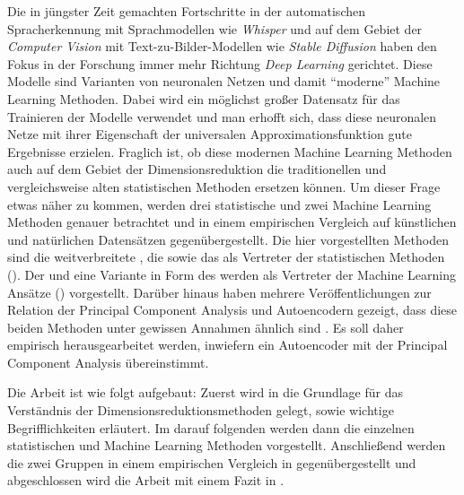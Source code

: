 Die in jüngster Zeit gemachten Fortschritte in der automatischen Spracherkennung mit Sprachmodellen
wie \textit{Whisper} \parencite{Radford.2022} und auf dem Gebiet der \textit{Computer Vision} mit Text-zu-Bilder-Modellen
wie \textit{Stable Diffusion} \parencite{Rombach.2021} haben den Fokus in der Forschung immer mehr Richtung \textit{Deep Learning}
gerichtet. Diese Modelle sind Varianten von neuronalen Netzen und damit \enquote{moderne} Machine
Learning Methoden. Dabei wird ein möglichst großer Datensatz für das Trainieren der Modelle
verwendet und man erhofft sich, dass diese neuronalen Netze mit ihrer Eigenschaft der universalen
Approximationsfunktion \parencites[194 -- 197]{Goodfellow.2016}{Hornik.1989} gute Ergebnisse erzielen. Fraglich ist, ob diese
modernen Machine Learning Methoden auch auf dem Gebiet der Dimensionsreduktion die traditionellen
und vergleichsweise alten statistischen Methoden ersetzen können. Um dieser Frage etwas näher zu
kommen, werden drei statistische und zwei Machine Learning Methoden genauer betrachtet und in einem
empirischen Vergleich auf künstlichen und natürlichen Datensätzen gegenübergestellt. Die hier
vorgestellten Methoden sind die weitverbreitete , die
 sowie das  als
Vertreter der statistischen Methoden (). Der
 und eine Variante in Form des  werden als
Vertreter der Machine Learning Ansätze () vorgestellt. Darüber
hinaus haben mehrere Veröffentlichungen zur Relation der Principal Component Analysis und
Autoencodern gezeigt, dass diese beiden Methoden unter gewissen Annahmen ähnlich sind \parencites{Baldi.1989}{Bourlard.1988}{Plaut.2018}. Es soll daher empirisch herausgearbeitet werden,
inwiefern ein Autoencoder mit der Principal Component Analysis übereinstimmt.

Die Arbeit ist wie folgt aufgebaut: Zuerst wird in  die Grundlage
für das Verständnis der Dimensionsreduktionsmethoden gelegt, sowie wichtige Begrifflichkeiten
erläutert. Im darauf folgenden  werden dann die einzelnen
statistischen und Machine Learning Methoden vorgestellt. Anschließend werden die zwei Gruppen in
einem empirischen Vergleich in  gegenübergestellt und abgeschlossen wird die
Arbeit mit einem Fazit in .